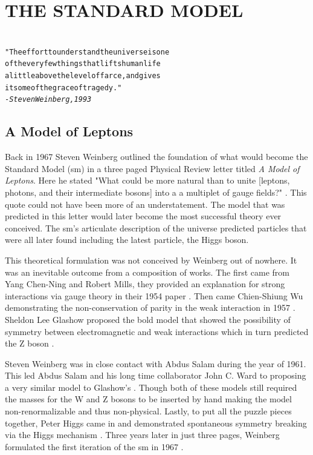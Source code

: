 \begingroup
\clearpage%
\let\clearpage\relax%
\vspace*{-16pt}%
\chapter[THE STANDARD MODEL]{THE STANDARD MODEL}
\endgroup

\begin{alltt}
{\footnotesize \centering
"The effort to understand the universe is one 
of the very few things that lifts human life
a little above the level of farce, and gives 
it some of the grace of tragedy." 
                                  - \emph{Steven Weinberg, 1993}}                               
\end{alltt}


\section{A Model of Leptons}

Back in 1967 Steven Weinberg outlined the foundation of what would become the Standard Model (\gls{sm}) in 
a three paged Physical Review letter titled \emph{A Model of Leptons}. Here he stated "What could be more 
natural than to unite [leptons, photons, and their intermediate bosons] into a a multiplet
of gauge fields?" \cite{weinberg}. This quote could not have been more of an understatement.
The model that was predicted in this letter would later become the most successful theory ever
conceived. The \gls{sm}'s articulate description of the universe predicted particles that
were all later found including the latest particle, the Higgs boson. 
\par
This theoretical formulation was not conceived by Weinberg out of nowhere. It was an inevitable outcome 
from a composition of works. The first came from Yang Chen-Ning and Robert Mills, they provided an explanation
for strong interactions via gauge theory in their 1954 paper \cite{yang-mills}. Then came Chien-Shiung Wu 
demonstrating the non-conservation of parity in the weak interaction in 1957 \cite{wu}.
Sheldon Lee Glashow proposed the bold  model that showed
the possibility of symmetry between electromagnetic and weak interactions which in turn predicted
the Z boson \cite{Glashow}. 
\par
Steven Weinberg was in close contact with Abdus Salam during the year of 1961.
This led Abdus Salam and his long time collaborator John C. Ward to proposing a very similar model to 
Glashow's  \cite{Salam}. Though both of these models still required
the masses for the W and Z bosons to be inserted by hand making the model non-renormalizable and thus
non-physical. Lastly, to put all the puzzle pieces together, Peter Higgs came in and 
demonstrated spontaneous symmetry breaking via the Higgs mechanism \cite{Higgs}. 
Three years later in just three pages, Weinberg formulated the first iteration of the \gls{sm} in 1967 \cite{weinberg}.

